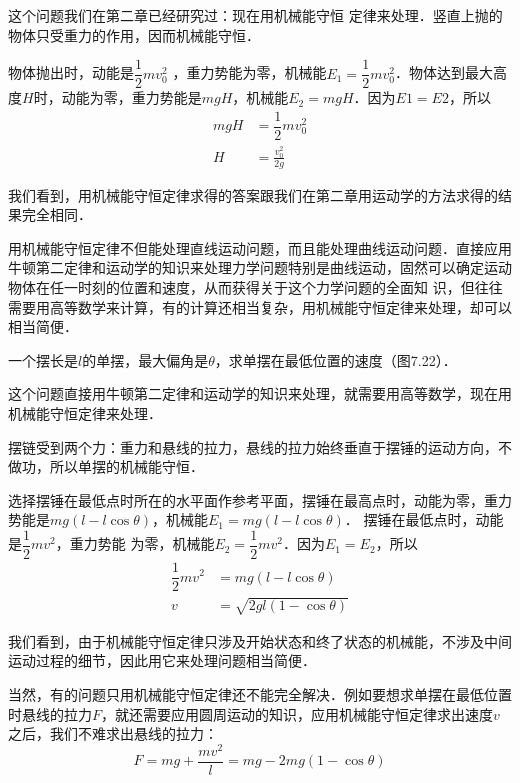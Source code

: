 \begin{solution}
    这个问题我们在第二章已经研究过：现在用机械能守恒
    定律来处理．竖直上抛的物体只受重力的作用，因而机械能守恒．

    物体抛出时，动能是$\dfrac{1}{2}mv^2_0$ ，重力势能为零，机械能$E_1=\dfrac{1}{2}mv^2_0$．物体达到最大高度$H$时，动能为零，重力势能是$mgH$，机械能$E_2=mgH$．因为$E1=E2$，所以
    \[\begin{split}
            mgH & =\dfrac{1}{2}mv^2_0 \\
            H   & =\frac{v^2_0}{2g}
        \end{split}\]
\end{solution}

我们看到，用机械能守恒定律求得的答案跟我们在第二章用运动学的方法求得的结果完全相同．

用机械能守恒定律不但能处理直线运动问题，而且能处理曲线运动问题．直接应用牛顿第二定律和运动学的知识来处理力学问题特别是曲线运动，固然可以确定运动物体在任一时刻的位置和速度，从而获得关于这个力学问题的全面知
识，但往往需要用高等数学来计算，有的计算还相当复杂，用机械能守恒定律来处理，却可以相当简便．


\begin{example}
    一个摆长是$l$的单摆，最大偏角是$\theta$，求单摆在最低位置的速度（图7.22）．
\end{example}


\begin{solution}
    这个问题直接用牛顿第二定律和运动学的知识来处理，就需要用高等数学，现在用机械能守恒定律来处理．

    摆链受到两个力：重力和悬线的拉力，悬线的拉力始终垂直于摆锤的运动方向，不做功，所以单摆的机械能守恒．

    选择摆锤在最低点时所在的水平面作参考平面，摆锤在最高点时，动能为零，重力势能是$mg(l-l\cos\theta)$，机械能$E_1=mg(l-l\cos\theta)$． 摆锤在最低点时，动能是$\dfrac{1}{2}mv^2$，重力势能
    为零，机械能$E_2=\dfrac{1}{2}mv^2$．因为$E_1=E_2$，所以
    \[\begin{split}
            \dfrac{1}{2}mv^2 & =mg(l-l\cos\theta)        \\
            v                & =\sqrt{2gl(1-\cos\theta)}
        \end{split}\]
\end{solution}

我们看到，由于机械能守恒定律只涉及开始状态和终了状态的机械能，不涉及中间运动过程的细节，因此用它来处理问题相当简便．

当然，有的问题只用机械能守恒定律还不能完全解决．例如要想求单摆在最低位置时悬线的拉力$F$，就还需要应用圆周运动的知识，应用机械能守恒定律求出速度$v$之后，我们不难求出悬线的拉力：
\[F=mg+\frac{mv^2}{l}=mg-2mg (1-\cos\theta)\]

